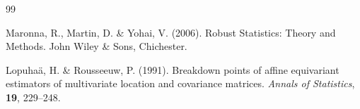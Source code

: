 \documentclass{icorsdssv2024}
\begin{document}
\begin{thebibliography}{99}

 Maronna, R., Martin, D. \& Yohai, V. (2006). Robust Statistics: Theory and Methods. John Wiley \& Sons, Chichester.

 Lopuha\"a, H. \& Rousseeuw, P. (1991). Breakdown points of affine equivariant estimators of multivariate location and covariance matrices. \emph{Annals of Statistics}, \textbf{19}, 229--248.

\end{thebibliography}
\end{document}
